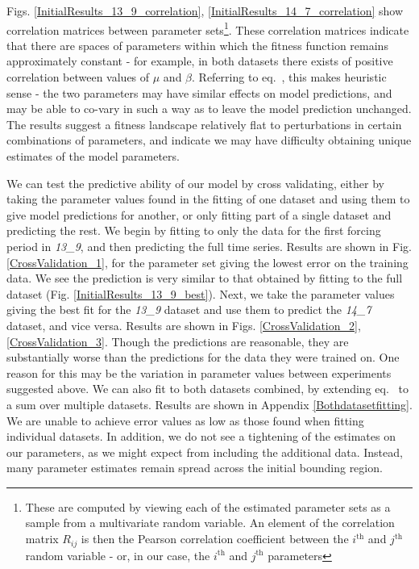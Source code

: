 \documentclass[10pt,journal]{./IEEE_latex_class/IEEEtran}
\renewcommand{\eqref}{eq.~\originaleqref}
\begin{document}
Figs. \ref{InitialResults_13_9_correlation}, \ref{InitialResults_14_7_correlation} show correlation matrices between parameter sets\footnote{These are computed by viewing each of the estimated parameter sets as a sample from a multivariate random variable. An element of the correlation matrix $R_{ij}$ is then the Pearson correlation coefficient between the $i^\mathrm{th}$ and $j^\mathrm{th}$ random variable - or, in our case, the $i^\mathrm{th}$ and $j^\mathrm{th}$ parameters}. These correlation matrices indicate that there are spaces of parameters within which the fitness function remains approximately constant - for example, in both datasets there exists of positive correlation between values of $\mu$ and $\beta$. Referring to \eqref{eq:p}, this makes heuristic sense - the two parameters may have similar effects on model predictions, and may be able to co-vary in such a way as to leave the model prediction unchanged.
The results suggest a fitness landscape relatively flat to perturbations in certain combinations of parameters, and indicate we may have difficulty obtaining unique estimates of the model parameters.
 
 We can test the predictive ability of our model by cross validating, either by taking the parameter values found in the fitting of one dataset and using them to give model predictions for another, or only fitting part of a single dataset and predicting the rest.  We begin by fitting to only the data for the first forcing period in \textit{13\_9}, and then predicting the full time series. Results are shown in Fig. \ref{CrossValidation_1}, for the parameter set giving the lowest error on the training data. We see the prediction is very similar to that obtained by fitting to the full dataset (Fig. \ref{InitialResults_13_9_best}). Next, we take the parameter values giving the best fit for the  \textit{13\_9} dataset and use them to predict the \textit{14\_7} dataset, and vice versa. Results are shown in Figs. \ref{CrossValidation_2}, \ref{CrossValidation_3}.
Though the predictions are reasonable, they are substantially worse than the predictions for the data they were trained on. One reason for this may be the variation in parameter values between experiments suggested above. We can also fit to both datasets combined, by extending \eqref{eq:min} to a sum over multiple datasets. Results are shown in Appendix \ref{Bothdatasetfitting}. We are unable to achieve error values as low as those found when fitting individual datasets. In addition, we do not see a tightening of the estimates on our parameters, as we might expect from including the additional data. Instead, many parameter estimates remain spread across the initial bounding region. 
\end{document}
